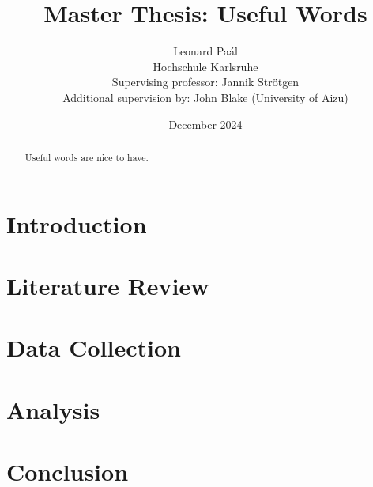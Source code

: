 \documentclass[12pt]{report}
\title{Master Thesis: Useful Words}
\author{Leonard Paál\\Hochschule Karlsruhe\\Supervising professor: Jannik Strötgen\\Additional supervision by: John Blake (University of Aizu)}
\date{December 2024}
\begin{document}
\maketitle
\begin{abstract}
	\noindent Useful words are nice to have.
\end{abstract}

\clearpage
\tableofcontents
\clearpage

\chapter{Introduction}

\chapter{Literature Review}

\chapter{Data Collection}

\chapter{Analysis}

\chapter{Conclusion}




\end{document}
